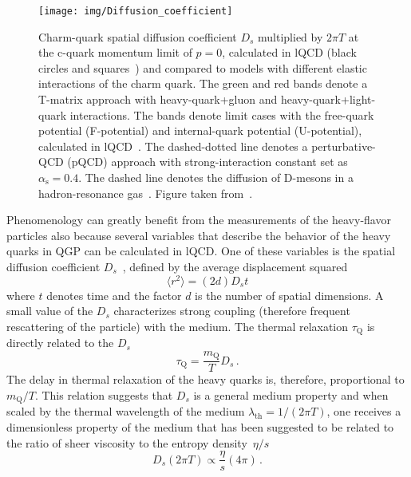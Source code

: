 \begin{figure}[!htb]
\begin{center}
 \texttt{[image: img/Diffusion\_coefficient]}
\caption[Charm-quark spatial diffusion coefficient $D_s$.]{\label{diffusion}Charm-quark spatial diffusion coefficient $D_s$ multiplied by $2\pi T$ at the c-quark momentum limit of $p = 0$, calculated in lQCD (black circles and squares~\cite{BanerjeeLattice,DingLattice}) and compared to models with different elastic interactions of the charm quark. The green and red bands denote a T-matrix approach with heavy-quark+gluon and heavy-quark+light-quark interactions. The bands denote limit cases with the free-quark potential (F-potential) and internal-quark potential (U-potential), calculated in lQCD~\cite{Tmatrix}\@. The dashed-dotted line denotes a perturbative-QCD (pQCD) approach with strong-interaction constant set as $\alpha_\mathrm{s} = 0.4$\@. The dashed line denotes the diffusion of D-mesons in a hadron-resonance gas~\cite{DmesonHRG}\@. Figure taken from~\cite{summaryHF}.}
\end{center}
\end{figure}


Phenomenology can greatly benefit from the measurements of the heavy-flavor particles also because several variables that describe the behavior of the heavy quarks in QGP can be calculated in lQCD\@.  One of these variables is the spatial diffusion coefficient $D_s$~\cite{BanerjeeLattice,DingLattice}, defined by the average displacement squared
\begin{equation}
 \langle r^2 \rangle = (2d) D_s t
\end{equation}
where $t$ denotes time and the factor $d$ is the number of spatial dimensions. A small value of the $D_s$ characterizes strong coupling (therefore frequent rescattering of the particle) with the medium. The thermal relaxation $\tau_\mathrm{Q}$ is directly related to the $D_s$~\cite{Prino_Rapp_HF}
\begin{equation}
 \tau_\mathrm{Q} = \frac{m_\mathrm{Q}}{T} D_s\,.
\end{equation}
The delay in thermal relaxation of the heavy quarks is, therefore, proportional to $m_\mathrm{Q}/T$\@. This relation suggests that $D_s$ is a general medium property and when scaled by the thermal wavelength of the medium $\lambda_\mathrm{th} = 1/(2 \pi T)$, one receives a dimensionless property of the medium that has been suggested to be related to the ratio of sheer viscosity to the entropy density~$\eta/s$~\cite{heavyThermalizationAndEtaOverS,QGP4}
\begin{equation}
D_s(2\pi T) \propto \frac{\eta}{s} (4\pi)\,.
\end{equation}

